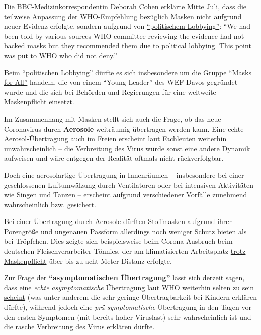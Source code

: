 Die BBC-Medizinkorrespondentin Deborah Cohen erklärte Mitte Juli, dass
die teilweise Anpassung der WHO-Empfehlung bezüglich Masken nicht
aufgrund neuer Evidenz erfolgte, sondern aufgrund von
\href{https://twitter.com/ClarkeMicah/status/1282987860090593280}{``politischem
Lobbying''}: ``We had been told by various sources WHO committee
reviewing the evidence had not backed masks but they recommended them
due to political lobbying. This point was put to WHO who did not deny.''

Beim ``politischen Lobbying'' dürfte es sich insbesondere um die Gruppe
\href{https://masks4all.co/about-us/}{``Masks for All''} handeln, die
von einem ``Young Leader'' des WEF Davos gegründet wurde und die sich
bei Behörden und Regierungen für eine weltweite Maskenpflicht einsetzt.

Im Zusammenhang mit Masken stellt sich auch die Frage, ob das neue
Coronavirus durch \textbf{Aerosole} weiträumig übertragen werden kann.
Eine echte Aerosol-Übertragung auch im Freien erscheint laut Fachleuten
\href{https://jamanetwork.com/journals/jama/fullarticle/2768396}{weiterhin
unwahrscheinlich} -- die Verbreitung des Virus würde sonst eine andere
Dynamik aufweisen und wäre entgegen der Realität oftmals nicht
rückverfolgbar.

Doch eine aerosolartige Übertragung in Innenräumen -- insbesondere bei
einer geschlossenen Luftumwälzung durch Ventilatoren oder bei intensiven
Aktivitäten wie Singen und Tanzen -- erscheint aufgrund verschiedener
Vorfälle zunehmend wahrscheinlich bzw. gesichert.

Bei einer Übertragung durch Aerosole dürften Stoffmasken aufgrund ihrer
Porengröße und ungenauen Passform allerdings noch weniger Schutz bieten
als bei Tröpfchen. Dies zeigte sich beispielsweise beim Corona-Ausbruch
beim deutschen Fleischverarbeiter Tönnies, der am klimatisierten
Arbeitsplatz
\href{https://swprs.org/tonnies-corona-ausbruch-trotz-maskenpflicht/}{trotz
Maskenpflicht} über bis zu acht Meter Distanz erfolgte.

Zur Frage der \textbf{``asymptomatischen Übertragung''} lässt sich
derzeit sagen, dass eine \emph{echte} \emph{asymptomatische} Übertragung
laut WHO weiterhin
\href{https://www.webmd.com/lung/news/20200609/who-clairifies-comments-on-asymptomatic-covid-spread}{selten
zu sein scheint} (was unter anderem die sehr geringe Übertragbarkeit bei
Kindern erklären dürfte), während jedoch eine \emph{prä-symptomatische}
Übertragung in den Tagen vor den ersten Symptomen (mit bereits hoher
Viruslast) sehr wahrscheinlich ist und die rasche Verbreitung des Virus
erklären dürfte.

